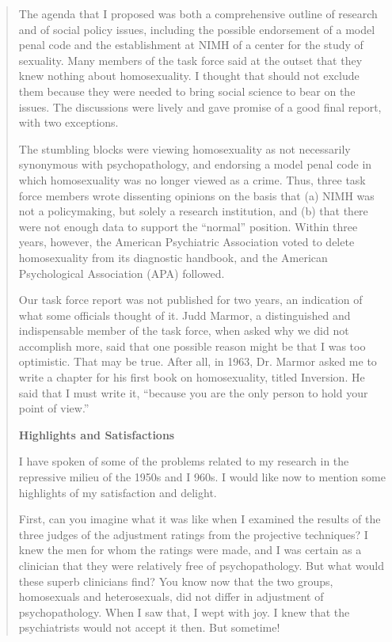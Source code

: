 \begin{refsection}
\begin{quote}
The agenda that I proposed was both a comprehensive outline of research and of social policy issues, including the possible endorsement of a model penal code and the establishment at NIMH of a center for the study of sexuality. Many members of the task force said at the outset that they knew nothing about homosexuality. I thought that should not exclude them because they were needed to bring social science to bear on the issues. The discussions were lively and gave promise of a good final report, with two exceptions.

The stumbling blocks were viewing homosexuality as not necessarily synonymous with psychopathology, and endorsing a model penal code in which homosexuality was no longer viewed as a crime. Thus, three task force members wrote dissenting opinions on the basis that (a) NIMH was not a policymaking, but solely a research institution, and (b) that there were not enough data to support the ``normal'' position. Within three years, however, the American Psychiatric Association voted to delete homosexuality from its diagnostic handbook, and the American Psychological Association (APA) followed.

Our task force report was not published for two years, an indication of what some officials thought of it. Judd Marmor, a distinguished and indispensable member of the task force, when asked why we did not accomplish more, said that one possible reason might be that I was too optimistic. That may be true. After all, in 1963, Dr. Marmor asked me to write a chapter for his first book on homosexuality, titled Inversion. He said that I must write it, ``because you are the only person to hold your point of view.''

\textbf{Highlights and Satisfactions} 

I have spoken of some of the problems related to my research in the repressive milieu of the 1950s and I 960s. I would like now to mention some highlights of my satisfaction and delight.

First, can you imagine what it was like when I examined the results of the three judges of the adjustment ratings from the projective techniques? I knew the men for whom the ratings were made, and I was certain as a clinician that they were relatively free of psychopathology. But what would these superb clinicians find? You know now that the two groups, homosexuals and heterosexuals, did not differ in adjustment of psychopathology. When I saw that, I wept with joy. I knew that the psychiatrists would not accept it then. But sometime!


\end{quote}
\end{refsection}
